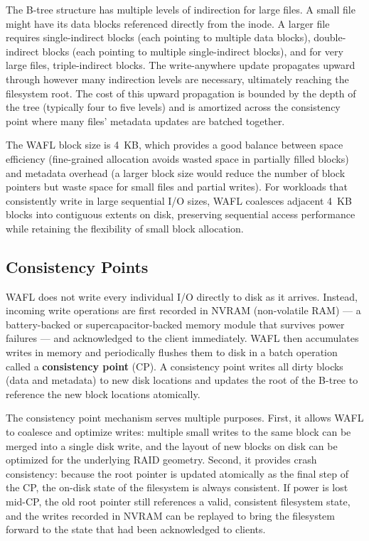 The B-tree structure has multiple levels of indirection for large files. A small file might have its data blocks referenced directly from the inode. A larger file requires single-indirect blocks (each pointing to multiple data blocks), double-indirect blocks (each pointing to multiple single-indirect blocks), and for very large files, triple-indirect blocks. The write-anywhere update propagates upward through however many indirection levels are necessary, ultimately reaching the filesystem root. The cost of this upward propagation is bounded by the depth of the tree (typically four to five levels) and is amortized across the consistency point where many files' metadata updates are batched together.

The WAFL block size is 4~KB, which provides a good balance between space efficiency (fine-grained allocation avoids wasted space in partially filled blocks) and metadata overhead (a larger block size would reduce the number of block pointers but waste space for small files and partial writes). For workloads that consistently write in large sequential I/O sizes, WAFL coalesces adjacent 4~KB blocks into contiguous extents on disk, preserving sequential access performance while retaining the flexibility of small block allocation.

\subsection{Consistency Points}

WAFL does not write every individual I/O directly to disk as it arrives. Instead, incoming write operations are first recorded in NVRAM (non-volatile RAM) --- a battery-backed or supercapacitor-backed memory module that survives power failures --- and acknowledged to the client immediately. WAFL then accumulates writes in memory and periodically flushes them to disk in a batch operation called a \textbf{consistency point} (CP). A consistency point writes all dirty blocks (data and metadata) to new disk locations and updates the root of the B-tree to reference the new block locations atomically.

The consistency point mechanism serves multiple purposes. First, it allows WAFL to coalesce and optimize writes: multiple small writes to the same block can be merged into a single disk write, and the layout of new blocks on disk can be optimized for the underlying RAID geometry. Second, it provides crash consistency: because the root pointer is updated atomically as the final step of the CP, the on-disk state of the filesystem is always consistent. If power is lost mid-CP, the old root pointer still references a valid, consistent filesystem state, and the writes recorded in NVRAM can be replayed to bring the filesystem forward to the state that had been acknowledged to clients.


